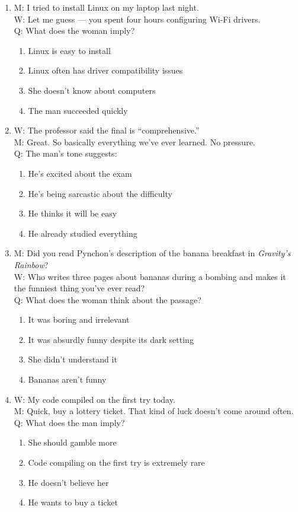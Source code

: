 \documentclass[10pt,a4paper]{article}
\begin{document}
\begin{enumerate}[label=\textbf{\arabic*.}, leftmargin=*]

\item M: I tried to install Linux on my laptop last night.\\
W: Let me guess --- you spent four hours configuring Wi-Fi drivers.\\
Q: What does the woman imply?
\begin{enumerate}[label=(\Alph*)]
\item Linux is easy to install
\item Linux often has driver compatibility issues
\item She doesn't know about computers
\item The man succeeded quickly
\end{enumerate}

\item W: The professor said the final is ``comprehensive.''\\
M: Great. So basically everything we've ever learned. No pressure.\\
Q: The man's tone suggests:
\begin{enumerate}[label=(\Alph*)]
\item He's excited about the exam
\item He's being sarcastic about the difficulty
\item He thinks it will be easy
\item He already studied everything
\end{enumerate}

\item M: Did you read Pynchon's description of the banana breakfast
in \emph{Gravity's Rainbow}?\\
W: Who writes three pages about bananas during a bombing and makes
it the funniest thing you've ever read?\\
Q: What does the woman think about the passage?
\begin{enumerate}[label=(\Alph*)]
\item It was boring and irrelevant
\item It was absurdly funny despite its dark setting
\item She didn't understand it
\item Bananas aren't funny
\end{enumerate}

\item W: My code compiled on the first try today.\\
M: Quick, buy a lottery ticket. That kind of luck doesn't come
around often.\\
Q: What does the man imply?
\begin{enumerate}[label=(\Alph*)]
\item She should gamble more
\item Code compiling on the first try is extremely rare
\item He doesn't believe her
\item He wants to buy a ticket
\end{enumerate}


\end{enumerate}
\end{document}
